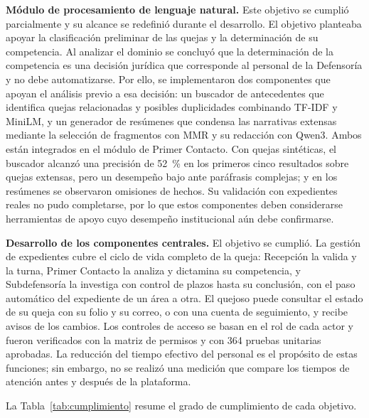 \textbf{Módulo de procesamiento de lenguaje natural.} Este objetivo se cumplió parcialmente y su alcance se redefinió durante el desarrollo. El objetivo planteaba apoyar la clasificación preliminar de las quejas y la determinación de su competencia. Al analizar el dominio se concluyó que la determinación de la competencia es una decisión jurídica que corresponde al personal de la Defensoría y no debe automatizarse. Por ello, se implementaron dos componentes que apoyan el análisis previo a esa decisión: un buscador de antecedentes que identifica quejas relacionadas y posibles duplicidades combinando TF-IDF y MiniLM, y un generador de resúmenes que condensa las narrativas extensas mediante la selección de fragmentos con MMR y su redacción con Qwen3. Ambos están integrados en el módulo de Primer Contacto. Con quejas sintéticas, el buscador alcanzó una precisión de 52~\% en los primeros cinco resultados sobre quejas extensas, pero un desempeño bajo ante paráfrasis complejas; y en los resúmenes se observaron omisiones de hechos. Su validación con expedientes reales no pudo completarse, por lo que estos componentes deben considerarse herramientas de apoyo cuyo desempeño institucional aún debe confirmarse.

\textbf{Desarrollo de los componentes centrales.} El objetivo se cumplió. La gestión de expedientes cubre el ciclo de vida completo de la queja: Recepción la valida y la turna, Primer Contacto la analiza y dictamina su competencia, y Subdefensoría la investiga con control de plazos hasta su conclusión, con el paso automático del expediente de un área a otra. El quejoso puede consultar el estado de su queja con su folio y su correo, o con una cuenta de seguimiento, y recibe avisos de los cambios. Los controles de acceso se basan en el rol de cada actor y fueron verificados con la matriz de permisos y con 364 pruebas unitarias aprobadas. La reducción del tiempo efectivo del personal es el propósito de estas funciones; sin embargo, no se realizó una medición que compare los tiempos de atención antes y después de la plataforma.

La Tabla~\ref{tab:cumplimiento} resume el grado de cumplimiento de cada objetivo.

